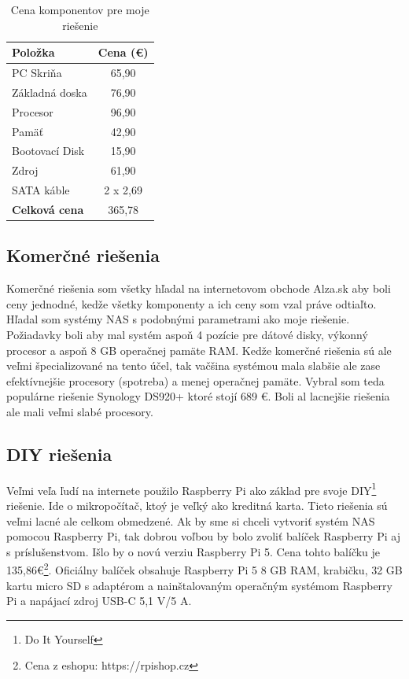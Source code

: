 \documentclass[12pt,oneside,slovak,a4paper]{article}
\begin{document}
\begin{table}[h]
\centering
\begin{tabular}{|l|c|}
\hline
\textbf{Položka} & \textbf{Cena (€)} \\ \hline
PC Skriňa & 65,90 \\ \hline
Základná doska & 76,90 \\ \hline
Procesor & 96,90 \\ \hline
Pamäť & 42,90 \\ \hline
Bootovací Disk & 15,90 \\ \hline
Zdroj & 61,90 \\ \hline
SATA káble & 2 x 2,69 \\ \hline
\textbf{Celková cena} & 365,78 \\ \hline
\end{tabular}
\caption{Cena komponentov pre moje riešenie}
\end{table}

\subsection{Komerčné riešenia}
Komerčné riešenia som všetky hľadal na internetovom obchode Alza.sk aby boli ceny jednodné, kedže všetky komponenty a ich ceny som vzal práve odtiaľto. Hľadal som systémy NAS s podobnými parametrami ako moje riešenie. Požiadavky boli aby mal systém aspoň 4 pozície pre dátové disky, výkonný procesor a aspoň 8 GB operačnej pamäte RAM. Kedže komerčné riešenia sú ale veľmi špecializované na tento účel, tak vačšina systémou mala slabšie ale zase efektívnejšie procesory (spotreba) a menej operačnej pamäte. Vybral som teda populárne riešenie Synology DS920+ ktoré stojí 689 €. Boli al lacnejšie riešenia ale mali veľmi slabé procesory.

\subsection{DIY riešenia}
Veľmi veľa ľudí na internete použilo Raspberry Pi ako základ pre svoje DIY\footnote{Do It Yourself} riešenie. Ide o mikropočítač, ktoý je veľký ako kreditná karta. Tieto riešenia sú veľmi lacné ale celkom obmedzené. Ak by sme si chceli vytvoriť systém NAS pomocou Raspberry Pi, tak dobrou voľbou by bolo zvoliť balíček Raspberry Pi aj s príslušenstvom. Išlo by o novú verziu Raspberry Pi 5. Cena tohto balíčku je 135,86€\footnote{Cena z eshopu: https://rpishop.cz}. Oficiálny balíček obsahuje Raspberry Pi 5 8 GB RAM, krabičku, 32 GB kartu micro SD s adaptérom a nainštalovaným operačným systémom Raspberry Pi a napájací zdroj USB-C 5,1 V/5 A.
\end{document}
